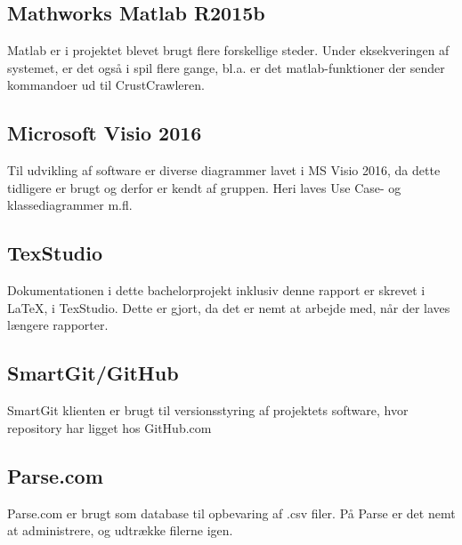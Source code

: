 \subsection*{Mathworks Matlab R2015b}
Matlab er i projektet blevet brugt flere forskellige steder. Under eksekveringen af systemet, er det også i spil flere gange, bl.a. er det matlab-funktioner der sender kommandoer ud til CrustCrawleren.

\subsection*{Microsoft Visio 2016}

Til udvikling af software er diverse diagrammer lavet i MS Visio 2016, da dette tidligere er brugt og derfor er kendt af gruppen. Heri laves Use Case- og klassediagrammer m.fl.

\subsection*{TexStudio}
Dokumentationen i dette bachelorprojekt inklusiv denne rapport er skrevet i \LaTeX, i TexStudio. Dette er gjort, da det er nemt at arbejde med, når der laves længere rapporter.

\subsection*{SmartGit/GitHub}
SmartGit klienten\citep{smartgit} er brugt til versionsstyring af projektets software, hvor repository har ligget hos GitHub.com\citep{github}

\subsection*{Parse.com}
Parse.com \citep{RefWorks:11} er brugt som database til opbevaring af .csv filer. På Parse er det nemt at administrere, og udtrække filerne igen.